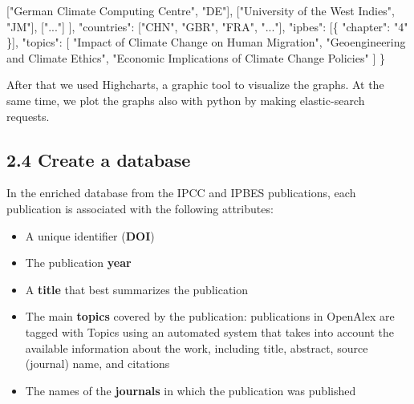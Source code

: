 \documentclass[
]{article}
\newenvironment{Shaded}{}{}
\newcommand{\DataTypeTok}[1]{\textcolor[rgb]{0.56,0.13,0.00}{#1}}
\newcommand{\FunctionTok}[1]{\textcolor[rgb]{0.02,0.16,0.49}{#1}}
\newcommand{\OtherTok}[1]{\textcolor[rgb]{0.00,0.44,0.13}{#1}}
\newcommand{\StringTok}[1]{\textcolor[rgb]{0.25,0.44,0.63}{#1}}
\providecommand{\tightlist}{%
  \setlength{\itemsep}{0pt}\setlength{\parskip}{0pt}}
\begin{document}
\begin{Shaded}
\begin{Highlighting}[]
    \OtherTok{[}\StringTok{"German Climate Computing Centre"}\OtherTok{,} \StringTok{"DE"}\OtherTok{],}
    \OtherTok{[}\StringTok{"University of the West Indies"}\OtherTok{,} \StringTok{"JM"}\OtherTok{],}
    \OtherTok{[}\StringTok{"..."}\OtherTok{]}
  \OtherTok{]}\FunctionTok{,}
  \DataTypeTok{"countries"}\FunctionTok{:} \OtherTok{[}\StringTok{"CHN"}\OtherTok{,} \StringTok{"GBR"}\OtherTok{,} \StringTok{"FRA"}\OtherTok{,} \StringTok{"..."}\OtherTok{]}\FunctionTok{,}
  \DataTypeTok{"ipbes"}\FunctionTok{:} \OtherTok{[}\FunctionTok{\{} \DataTypeTok{"chapter"}\FunctionTok{:} \StringTok{"4"} \FunctionTok{\}}\OtherTok{]}\FunctionTok{,}
  \DataTypeTok{"topics"}\FunctionTok{:} \OtherTok{[}
    \StringTok{"Impact of Climate Change on Human Migration"}\OtherTok{,}
    \StringTok{"Geoengineering and Climate Ethics"}\OtherTok{,}
    \StringTok{"Economic Implications of Climate Change Policies"}
  \OtherTok{]}
\FunctionTok{\}}
\end{Highlighting}
\end{Shaded}

After that we used Highcharts, a graphic tool to visualize the graphs.
At the same time, we plot the graphs also with python by making
elastic-search requests.

\hypertarget{create-a-database}{%
\subsection{2.4 Create a database}\label{create-a-database}}

In the enriched database from the IPCC and IPBES publications, each
publication is associated with the following attributes:

\begin{itemize}
\tightlist
\item
  A unique identifier (\textbf{DOI})
\item
  The publication \textbf{year}
\item
  A \textbf{title} that best summarizes the publication
\item
  The main \textbf{topics} covered by the publication: publications in
  OpenAlex are tagged with Topics using an automated system that takes
  into account the available information about the work, including
  title, abstract, source (journal) name, and citations
\item
  The names of the \textbf{journals} in which the publication was
  published
\end{itemize}
\end{document}
